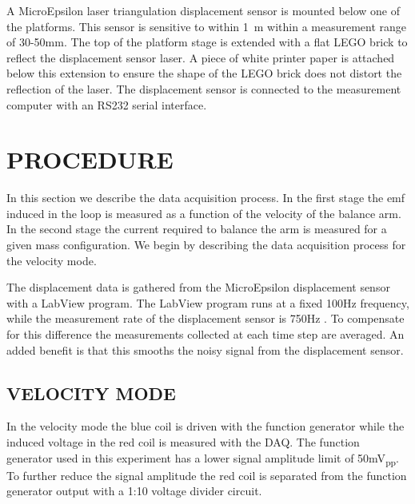 \documentclass[aps,prstab,reprint,12pt]{revtex4-1}
\begin{document}
A MicroEpsilon laser triangulation displacement sensor is mounted below one of the platforms. This sensor is sensitive to within 1\si{\mu m} within a measurement range of 30-50\si{mm}. The top of the platform stage is extended with a flat LEGO brick to reflect the displacement sensor laser. A piece of white printer paper is attached below this extension to ensure the shape of the LEGO brick does not distort the reflection of the laser. The displacement sensor is connected to the measurement computer with an RS232 serial interface.


\section{PROCEDURE}


In this section we describe the data acquisition process. In the first stage the emf induced in the loop is measured as a function of the velocity of the balance arm. In the second stage the current required to balance the arm is measured for a given mass configuration. We begin by describing the data acquisition process for the velocity mode. %

The displacement data is gathered from the MicroEpsilon displacement sensor with a LabView program. The LabView program runs at a fixed 100Hz frequency, while the measurement rate of the displacement sensor is 750Hz \cite{muepsilon_manual}. To compensate for this difference the measurements collected at each time step are averaged. An added benefit is that this smooths the noisy signal from the displacement sensor.

\subsection{VELOCITY MODE}

In the velocity mode the blue coil is driven with the function generator while the induced voltage in the red coil is measured with the DAQ. The function generator used in this experiment has a lower signal amplitude limit of 50\si{mV_{pp}}.
To further reduce the signal amplitude the red coil is separated from the function generator output with a 1:10 voltage divider circuit.
\end{document}
